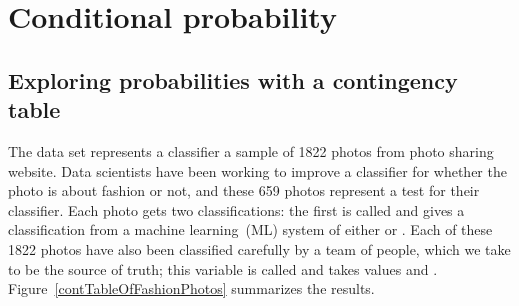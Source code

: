 \section{Conditional probability}
\label{conditionalProbabilitySection}



\subsection{Exploring probabilities with a contingency table}


\newcommand{\fashN}{1822}
\newcommand{\fashYY}{197}
\newcommand{\fashYN}{22}
\newcommand{\fashYA}{219}
\newcommand{\fashNY}{112}
\newcommand{\fashNN}{1491}
\newcommand{\fashNA}{1603}
\newcommand{\fashAY}{309}
\newcommand{\fashAN}{1513}
\newcommand{\fashAA}{\fashN{}}
\newcommand{\fashCYPY}{0.96}
\newcommand{\fashCYPN}{0.04}
\newcommand{\fashCNPY}{0.07}
\newcommand{\fashCNPN}{0.93}

The  data set represents
a classifier a sample of \fashN{} photos from photo sharing website.
Data scientists have been working to improve a classifier for
whether the photo is about fashion or not, and these 659 photos
represent a test for their classifier.
Each photo gets two classifications:
the first is called  and gives
a classification from a machine
learning~(ML) system of
either  or .
Each of these \fashN{} photos have also been classified carefully
by a team of people, which we take to be the source of truth;
this variable is called  and takes values
 and .
Figure~\ref{contTableOfFashionPhotos} summarizes the results.

